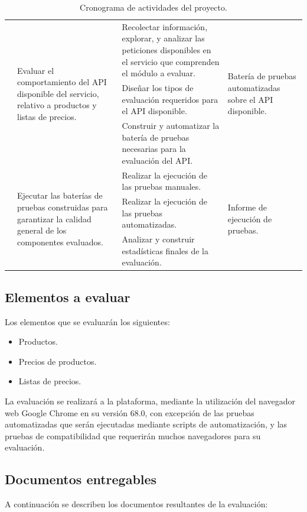 \begin{table}
\begin{tabular}{|l|l|p{6.5cm}|l|}
\cline{2-4}
& \multirow{3}{4.0cm}{Evaluar el comportamiento del API disponible del servicio, relativo a productos y listas de precios.} &
Recolectar información, explorar, y analizar las peticiones disponibles en el servicio que comprenden el módulo a evaluar. &
\multirow{3}{4.0cm}{Batería de pruebas automatizadas sobre el API disponible.} \\
\cline{3-3}
& & Diseñar los tipos de evaluación requeridos para el API disponible. & \\
\cline{3-3}
& & Construir y automatizar la batería de pruebas necesarias para la evaluación del API. & \\
\cline{2-4}
& \multirow{3}{4.0cm}{Ejecutar las baterías de pruebas construidas para garantizar la calidad general de los componentes evaluados.} &
Realizar la ejecución de las pruebas manuales. &
\multirow{3}{4.0cm}{Informe de ejecución de pruebas.} \\
\cline{3-3}
& & Realizar la ejecución de las pruebas automatizadas. & \\
\cline{3-3}
& & Analizar y construir estadísticas finales de la evaluación. & \\
\hline
\end{tabular}
\caption{Cronograma de actividades del proyecto.}
\label{cronograma}
\end{table}

\subsection{Elementos a evaluar}
Los elementos que se evaluarán los siguientes:

\begin{itemize}
\item Productos.
\item Precios de productos.
\item Listas de precios.
\end{itemize}

La evaluación se realizará a la plataforma, mediante la utilización del navegador
web Google Chrome en su versión 68.0, con excepción de las pruebas automatizadas
que serán ejecutadas mediante scripts de automatización, y las pruebas de
compatibilidad que requerirán muchos navegadores para su evaluación.

\subsection{Documentos entregables}
A continuación se describen los documentos resultantes de la evaluación:

